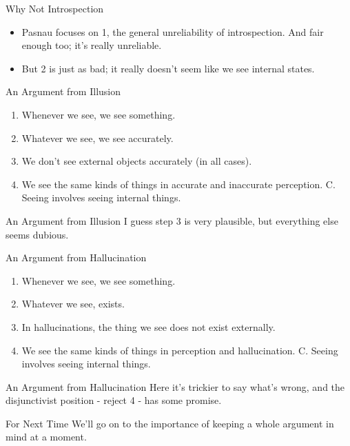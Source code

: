 \documentclass[
  17pt,
  letterpaper,
  ignorenonframetext,
  aspectratio=169,
]{beamer}
\providecommand{\tightlist}{%
  \setlength{\itemsep}{0pt}\setlength{\parskip}{0pt}}\usepackage{longtable,booktabs,array}
\begin{document}
\begin{frame}{Why Not Introspection}
\protect\hypertarget{why-not-introspection}{}
\begin{itemize}[<+->]
\tightlist
\item
  Pasnau focuses on 1, the general unreliability of introspection. And
  fair enough too; it's really unreliable.
\item
  But 2 is just as bad; it really doesn't seem like we see internal
  states.
\end{itemize}
\end{frame}

\begin{frame}{An Argument from Illusion}
\protect\hypertarget{an-argument-from-illusion}{}
\begin{enumerate}[<+->]
\tightlist
\item
  Whenever we see, we see something.
\item
  Whatever we see, we see accurately.
\item
  We don't see external objects accurately (in all cases).
\item
  We see the same kinds of things in accurate and inaccurate perception.
  C. Seeing involves seeing internal things.
\end{enumerate}
\end{frame}

\begin{frame}{An Argument from Illusion}
\protect\hypertarget{an-argument-from-illusion-1}{}
I guess step 3 is very plausible, but everything else seems dubious.
\end{frame}

\begin{frame}{An Argument from Hallucination}
\protect\hypertarget{an-argument-from-hallucination}{}
\begin{enumerate}[<+->]
\tightlist
\item
  Whenever we see, we see something.
\item
  Whatever we see, exists.
\item
  In hallucinations, the thing we see does not exist externally.
\item
  We see the same kinds of things in perception and hallucination. C.
  Seeing involves seeing internal things.
\end{enumerate}
\end{frame}

\begin{frame}{An Argument from Hallucination}
\protect\hypertarget{an-argument-from-hallucination-1}{}
Here it's trickier to say what's wrong, and the disjunctivist position -
reject 4 - has some promise.
\end{frame}

\begin{frame}{For Next Time}
\protect\hypertarget{for-next-time}{}
We'll go on to the importance of keeping a whole argument in mind at a
moment.
\end{frame}
\end{document}
